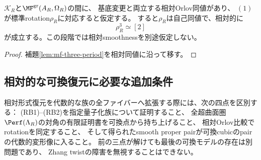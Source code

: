 \begin{corollary}[相対Orlov比較の下でのrotation]
\label{cor:relative-rotation-period}
$\mathcal K_R$と$\MF^{\mathrm{gr}}(A_R,\Omega_R)$の間に、
基底変更と両立する相対Orlov同値があり、
$(1)$が標準rotation$\rho_R$に対応すると仮定する。
すると$\rho_R$は自己同値で、相対的に
\[
\rho_R^3\simeq[2]
\]
が成立する。この段階では相対smoothnessを別途仮定しない。
\end{corollary}
\begin{proof}
補題\ref{lem:mf-three-period}を相対同値に沿って移す。
\end{proof}

\subsection{相対的な可換復元に必要な追加条件}
相対形式復元を代数的な族の全ファイバーへ拡張する際には、次の四点を区別する：
(RB1)--(RB2)を指定量子化族について証明すること、
全超曲面圏$\Perf(\Lambda_R)$の対角の有限証明書を可換点から持ち上げること、
相対Orlov比較でrotationを同定すること、
そして得られたsmooth proper pairが可換cubicのpairの代数的変形像に入ること。
前の三点が解けても最後の可換モデルの存在は別問題であり、
Zhang twistの障害を無視することはできない。
